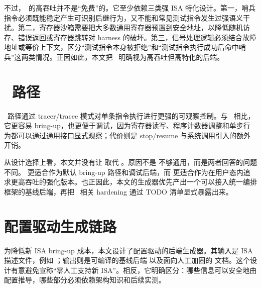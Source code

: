 不过，\memcage\ 的高吞吐并不是“免费”的。它至少依赖三类强 ISA 特化设计。第一，哨兵指令必须既能稳定产生可识别后继行为，又不能和常见测试指令发生过强语义干扰。第二，寄存器沙箱需要把大多数通用寄存器预置到安全地址，以降低随机访存、错误返回或寄存器跳转对 harness 的破坏。第三，信号处理逻辑必须结合故障地址或等价上下文，区分“测试指令本身被拒绝”和“测试指令执行成功后命中哨兵”这两类情况。正因如此，本文把 \memcage\ 明确视为高吞吐但高特化的后端。


\section{\ptracebackend\ 路径}

\ptracebackend\ 路径通过 tracer/tracee 模式对单条指令执行进行更强的可观察控制。与 \memcage\ 相比，它更容易 bring-up，也更便于调试，因为寄存器读写、程序计数器调整和单步行为都可以通过通用接口显式观察；代价则是 stop/resume 与系统调用引入的额外开销。

从设计选择上看，本文并没有让 \ptracebackend{} 取代 \memcage{}。原因不是 \ptracebackend{} 不够通用，而是两者回答的问题不同。\ptracebackend{} 更适合作为默认 bring-up 路径和调试后端，而 \memcage{} 更适合作为在用户态内追求更高吞吐的强化版本。也正因此，本文的生成器优先产出一个可以接入统一编排框架的基线后端，再把 \memcage\ 相关 hardening 通过 TODO 清单显式暴露出来。


\section{配置驱动生成链路}

为降低新 ISA bring-up 成本，本文设计了配置驱动的后端生成器。其输入是 ISA 描述文件，例如 ；输出则是可编译的基线后端  以及面向人工加固的  文档。这个设计有意避免宣称“零人工支持新 ISA”。相反，它明确区分：哪些信息可以安全地由配置推导，哪些部分必须依赖架构知识和后续实测。

